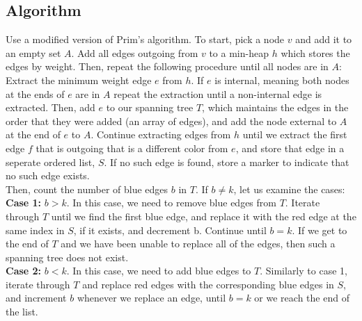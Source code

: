 \documentclass[12pt]{article}
\begin{document}
\subsection*{Algorithm}
Use a modified version of Prim's algorithm. To start, pick a node $v$ and add it to an empty set $A$. Add all edges outgoing from $v$ to a min-heap $h$ which stores the edges by weight. Then, repeat the following procedure until all nodes are in $A$:\\
Extract the minimum weight edge $e$ from $h$. If $e$ is internal, meaning both nodes at the ends of $e$ are in $A$ repeat the extraction until a non-internal edge is extracted. Then, add $e$ to our spanning tree $T$, which maintains the edges in the order that they were added (an array of edges), and add the node external to $A$ at the end of $e$ to $A$. Continue extracting edges from $h$ until we extract the first edge $f$ that is outgoing that is a different color from $e$, and store that edge in a seperate ordered list, $S$. If no such edge is found, store a marker to indicate that no such edge exists.\\
Then, count the number of blue edges $b$ in $T$. If $b \ne k$, let us examine the cases:\\
\textbf{Case 1:} $b > k$. In this case, we need to remove blue edges from $T$. Iterate through $T$ until we find the first blue edge, and replace it with the red edge at the same index in $S$, if it exists, and decrement b. Continue until $b = k$. If we get to the end of $T$ and we have been unable to replace all of the edges, then such a spanning tree does not exist.\\
\textbf{Case 2:} $b < k$. In this case, we need to add blue edges to $T$. Similarly to case 1, iterate through $T$ and replace red edges with the corresponding blue edges in $S$, and increment $b$ whenever we replace an edge, until $b = k$ or we reach the end of the list.\\
\end{document}
